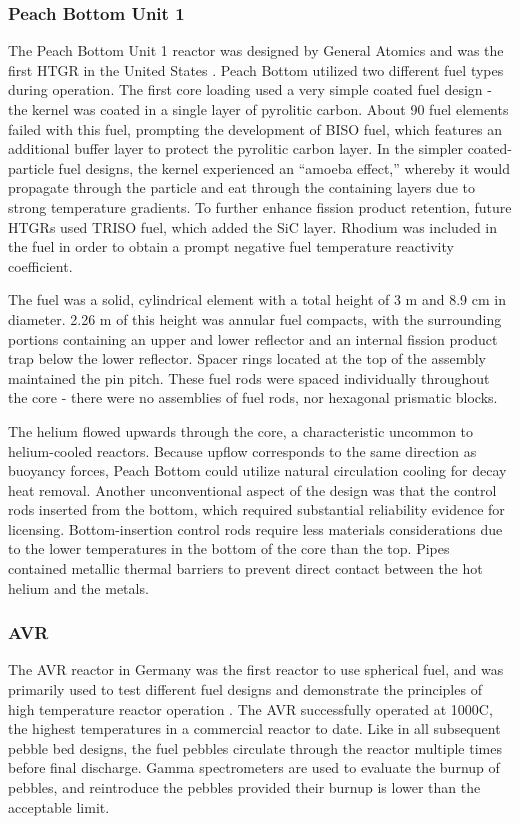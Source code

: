 \documentclass[10pt]{article}
\numberwithin{equation}{section} %
\begin{document}
\subsubsection{Peach Bottom Unit 1}
The Peach Bottom Unit 1 reactor was designed by General Atomics and was the first HTGR in the United States \cite{PeachBottomFuel}. Peach Bottom utilized two different fuel types during operation. The first core loading used a very simple coated fuel design - the kernel was coated in a single layer of pyrolitic carbon. About 90 fuel elements failed with this fuel, prompting the development of BISO fuel, which features an additional buffer layer to protect the pyrolitic carbon layer. In the simpler coated-particle fuel designs, the kernel experienced an ``amoeba effect,'' whereby it would propagate through the particle and eat through the containing layers due to strong temperature gradients. To further enhance fission product retention, future HTGRs used TRISO fuel, which added the SiC layer. Rhodium was included in the fuel in order to obtain a prompt negative fuel temperature reactivity coefficient.

The fuel was a solid, cylindrical element with a total height of 3 m and 8.9 cm in diameter. 2.26 m of this height was annular fuel compacts, with the surrounding portions containing an upper and lower reflector and an internal fission product trap below the lower reflector. Spacer rings located at the top of the assembly maintained the pin pitch. These fuel rods were spaced individually throughout the core - there were no assemblies of fuel rods, nor hexagonal prismatic blocks.

The helium flowed upwards through the core, a characteristic uncommon to helium-cooled reactors. Because upflow corresponds to the same direction as buoyancy forces, Peach Bottom could utilize natural circulation cooling for decay heat removal. Another unconventional aspect of the design was that the control rods inserted from the bottom, which required substantial reliability evidence for licensing. Bottom-insertion control rods require less materials considerations due to the lower temperatures in the bottom of the core than the top. Pipes contained metallic thermal barriers to prevent direct contact between the hot helium and the metals.

\subsubsection{AVR}
The AVR reactor in Germany was the first reactor to use spherical fuel, and was primarily used to test different fuel designs and demonstrate the principles of high temperature reactor operation \cite{AVRTheenhaus}. The AVR successfully operated at 1000\degree C, the highest temperatures in a commercial reactor to date. Like in all subsequent pebble bed designs, the fuel pebbles circulate through the reactor multiple times before final discharge. Gamma spectrometers are used to evaluate the burnup of pebbles, and reintroduce the pebbles provided their burnup is lower than the acceptable limit. 
\end{document}
